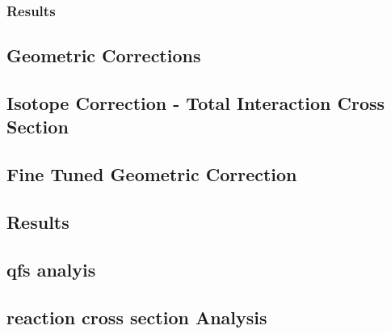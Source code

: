 %	


\subsubsection{Results}



\subsection{Geometric Corrections}
\subsection{Isotope Correction - Total Interaction Cross Section}
\subsection{Fine Tuned Geometric Correction}
\subsection{Results}
\subsection{qfs analyis}
\subsection{reaction cross section Analysis}

